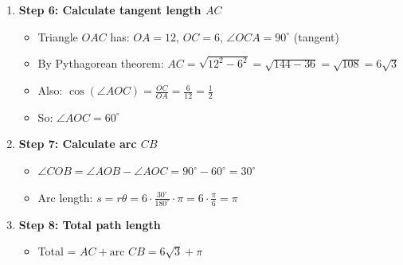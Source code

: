 \documentclass[12pt]{article}
\begin{document}
\begin{techniquesbox}
\begin{itemize}[leftmargin=*]
\begin{enumerate}
        \item \textbf{Step 6: Calculate tangent length $AC$}
        \begin{itemize}
            \item Triangle $OAC$ has: $OA = 12$, $OC = 6$, $\angle OCA = 90^\circ$ (tangent)
            \item By Pythagorean theorem: $AC = \sqrt{12^2 - 6^2} = \sqrt{144 - 36} = \sqrt{108} = 6\sqrt{3}$
            \item Also: $\cos(\angle AOC) = \frac{OC}{OA} = \frac{6}{12} = \frac{1}{2}$
            \item So: $\angle AOC = 60^\circ$
        \end{itemize}
        
        \item \textbf{Step 7: Calculate arc $CB$}
        \begin{itemize}
            \item $\angle COB = \angle AOB - \angle AOC = 90^\circ - 60^\circ = 30^\circ$
            \item Arc length: $s = r\theta = 6 \cdot \frac{30^\circ}{180^\circ} \cdot \pi = 6 \cdot \frac{\pi}{6} = \pi$
        \end{itemize}
        
        \item \textbf{Step 8: Total path length}
        \begin{itemize}
            \item Total = $AC + \text{arc } CB = 6\sqrt{3} + \pi$
        \end{itemize}
    \end{enumerate}
\end{itemize}


\end{techniquesbox}
\end{document}
